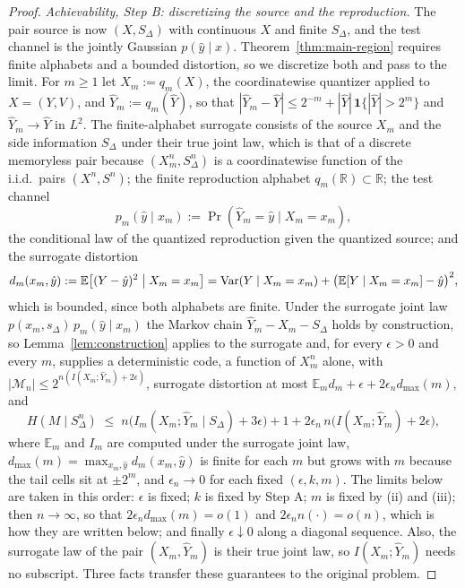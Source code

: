 \documentclass[11pt,onecolumn]{IEEEtran}
\newcommand{\E}{\mathbb{E}}
\newcommand{\R}{\mathbb{R}}
\newcommand{\hY}{\widehat{Y}}
\begin{document}
\begin{proof}
\emph{Achievability, Step B: discretizing the source and the
reproduction.} The pair source is now $(X,S_\Delta)$ with continuous
$X$ and finite $S_\Delta$, and the test channel is the jointly Gaussian
$p(\hat y\mid x)$. Theorem~\ref{thm:main-region} requires finite
alphabets and a bounded distortion, so we discretize both and pass to
the limit. For $m\ge1$ let $X_m:=q_m(X)$, the coordinatewise quantizer
applied to $X=(Y,V)$, and $\hY_m:=q_m(\hY)$, so that
$|\hY_m-\hY|\le2^{-m}+|\hY|\,\mathbf 1\{|\hY|>2^m\}$ and $\hY_m\to\hY$
in $L^2$. The finite-alphabet surrogate consists of the source $X_m$
and the side information $S_\Delta$ under their true joint law, which
is that of a discrete memoryless pair because $(X_m^n,S_\Delta^n)$ is a
coordinatewise function of the i.i.d.\ pairs $(X^n,S^n)$; the finite
reproduction alphabet $q_m(\R)\subset\R$; the test channel
\[
p_m(\hat y\mid x_m):=\Pr(\hY_m=\hat y\mid X_m=x_m),
\]
the conditional law of the quantized reproduction given the quantized
source; and the surrogate distortion
\[
d_m(x_m,\hat y):=\E\bigl[(Y-\hat y)^2\bigm|X_m=x_m\bigr]
=\operatorname{Var}(Y\mid X_m=x_m)+\bigl(\E[Y\mid X_m=x_m]-\hat y\bigr)^2,
\]
which is bounded, since both alphabets are finite.
Under the surrogate joint law $p(x_m,s_\Delta)\,p_m(\hat y\mid x_m)$
the Markov chain $\hY_m-X_m-S_\Delta$ holds by construction, so
Lemma~\ref{lem:construction} applies to the surrogate and, for every
$\epsilon>0$ and every $m$, supplies a deterministic code, a function of
$X_m^n$ alone, with $|\mathcal M_n|\le2^{n(I(X_m;\hY_m)+2\epsilon)}$,
surrogate distortion at most $\E_md_m+\epsilon+2\epsilon_nd_{\max}(m)$,
and
\begin{equation}
H(M\mid S_\Delta^n)\;\le\;
n\bigl(I_m(X_m;\hY_m\mid S_\Delta)+3\epsilon\bigr)
+1+2\epsilon_n\,n\bigl(I(X_m;\hY_m)+2\epsilon\bigr),
\label{eq:quant-fano}
\end{equation}
where $\E_m$ and $I_m$ are computed under the surrogate joint law,
$d_{\max}(m)=\max_{x_m,\hat y}d_m(x_m,\hat y)$ is finite for each $m$
but grows with $m$ because the tail cells sit at $\pm2^m$, and
$\epsilon_n\to0$ for each fixed $(\epsilon,k,m)$. The limits below are
taken in this order: $\epsilon$ is fixed; $k$ is fixed by Step A; $m$ is
fixed by (ii) and (iii); then $n\to\infty$, so that
$2\epsilon_nd_{\max}(m)=o(1)$ and $2\epsilon_nn(\cdot)=o(n)$, which is
how they are written below; and finally $\epsilon\downarrow0$ along a
diagonal sequence. Also, the
surrogate law of the pair $(X_m,\hY_m)$ is their true joint law, so
$I(X_m;\hY_m)$ needs no subscript. Three facts transfer these
guarantees to the original problem.


\end{proof}
\end{document}
